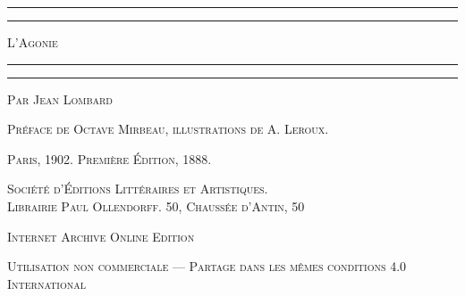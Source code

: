 \documentclass[a4paper, 11pt, oneside, polutonikogreek, french]{article}
\begin{document}
\begin{titlepage} %
	\centering %

	
	\rule{\textwidth}{1.6pt}\vspace*{-\baselineskip}\vspace*{2pt} %
	\rule{\textwidth}{0.4pt} %
	
	\vspace{1\baselineskip} %
	
	{\scshape\Huge L'Agonie}
	
	\vspace{1\baselineskip} %

	\rule{\textwidth}{0.4pt}\vspace*{-\baselineskip}\vspace{3.2pt} %
	\rule{\textwidth}{1.6pt} %
	
	\vspace{1\baselineskip} %
	
	
	{\scshape\Large Par Jean Lombard} %
	
	\vspace*{1\baselineskip} %
	
        {\scshape Préface de Octave Mirbeau, illustrations de A. Leroux.} %
    
        \vspace*{\fill}

	\vspace{1\baselineskip}

	{\small\scshape Paris, 1902. Première Édition, 1888.}
	
	{\small\scshape{Société d'Éditions Littéraires et Artistiques.\\ Librairie Paul Ollendorff. 50, Chaussée d'Antin, 50}}
	
	\vspace{0.5\baselineskip} %

        \scshape Internet Archive Online Edition  %
	
	{\scshape\small Utilisation non commerciale --- Partage dans les mêmes conditions 4.0 International} %
\end{titlepage}
\setlength{\parskip}{1mm plus1mm minus1mm}
\clearpage
\tableofcontents
\clearpage
\end{document}

